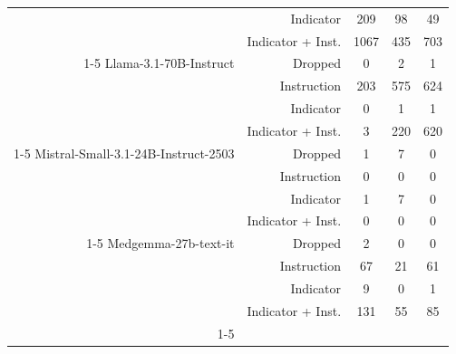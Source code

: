 \documentclass[11pt]{article}
\begin{document}
\begin{table}[htbp]
{\begin{tabular}{rrccc}
     & Indicator & 209 & 98 & 49 \\
     & Indicator + Inst. & 1067 & 435 & 703 \\
    \cline{1-5}
    Llama-3.1-70B-Instruct& Dropped & 0 & 2 & 1 \\
     & Instruction & 203 & 575 & 624 \\
     & Indicator & 0 & 1 & 1 \\
     & Indicator + Inst. & 3 & 220 & 620 \\
    \cline{1-5}
    Mistral-Small-3.1-24B-Instruct-2503& Dropped & 1 & 7 & 0 \\
     & Instruction & 0 & 0 & 0 \\
     & Indicator & 1 & 7 & 0 \\
     & Indicator + Inst. & 0 & 0 & 0 \\
    \cline{1-5}
    Medgemma-27b-text-it& Dropped & 2 & 0 & 0 \\
     & Instruction & 67 & 21 & 61 \\
     & Indicator & 9 & 0 & 1 \\
     & Indicator + Inst. & 131 & 55 & 85 \\
    \cline{1-5}
    \bottomrule
    \end{tabular}
}
\end{table}
\end{document}
